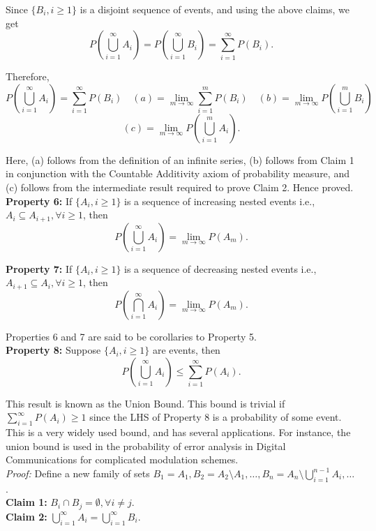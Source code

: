 Since \( \{B_i, i \geq 1\} \) is a disjoint sequence of events, and using the above claims, we get
\[
P\left(\bigcup_{i=1}^{\infty} A_i\right) = P\left(\bigcup_{i=1}^{\infty} B_i\right) = \sum_{i=1}^{\infty} P(B_i).
\]

Therefore,
\[
P\left(\bigcup_{i=1}^{\infty} A_i\right) = \sum_{i=1}^{\infty} P(B_i) \quad (a) = \lim_{m \to \infty} \sum_{i=1}^{m} P(B_i) \quad (b) = \lim_{m \to \infty} P\left(\bigcup_{i=1}^{m} B_i\right) \quad 
\]
\[
    (c) = \lim_{m \to \infty} P\left(\bigcup_{i=1}^{m} A_i\right).
\]

Here, (a) follows from the definition of an infinite series, (b) follows from Claim 1 in conjunction with the Countable Additivity axiom of probability measure, and (c) follows from the intermediate result required to prove Claim 2.  Hence proved.\\

\textbf{Property 6:} If \( \{A_i, i \geq 1\} \) is a sequence of increasing nested events i.e., \( A_i \subseteq A_{i+1}, \forall i \geq 1 \), then
\[
P\left(\bigcup_{i=1}^{\infty} A_i\right) = \lim_{m \to \infty} P(A_m).
\]

\textbf{Property 7:} If \( \{A_i, i \geq 1\} \) is a sequence of decreasing nested events i.e., \( A_{i+1} \subseteq A_i, \forall i \geq 1 \), then
\[
P\left(\bigcap_{i=1}^{\infty} A_i\right) = \lim_{m \to \infty} P(A_m). 
\]

Properties 6 and 7 are said to be corollaries to Property 5.\\

\textbf{Property 8:} Suppose \( \{A_i, i \geq 1\} \) are events, then
\[
P\left(\bigcup_{i=1}^{\infty} A_i\right) \leq \sum_{i=1}^{\infty} P(A_i).
\]

This result is known as the Union Bound. This bound is trivial if \( \sum_{i=1}^{\infty} P(A_i) \geq 1 \) since the LHS of Property 8 is a probability of some event. This is a very widely used bound, and has several applications. For instance, the union bound is used in the probability of error analysis in Digital Communications for complicated modulation schemes. \\

\textit{Proof:} Define a new family of sets \( B_1 = A_1, B_2 = A_2 \setminus A_1, \ldots, B_n = A_n \setminus \bigcup_{i=1}^{n-1} A_i, \ldots \).  \\

\textbf{Claim 1:} \( B_i \cap B_j = \emptyset, \forall i \neq j \).  \\
\textbf{Claim 2:} \( \bigcup_{i=1}^{\infty} A_i = \bigcup_{i=1}^{\infty} B_i \). \\ 

